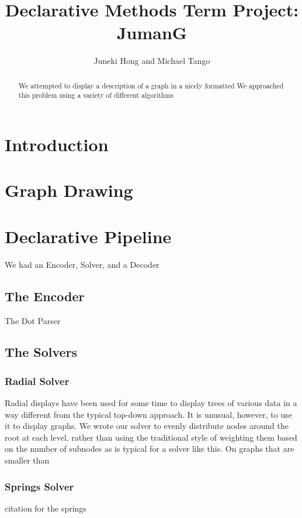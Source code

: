 \documentclass{article}
\title{Declarative Methods Term Project: \\ JumanG}
\author{Juneki Hong and Michael Tango}
\date{}
\begin{document}
\maketitle

\begin{abstract}
We attempted to display a description of a graph in a nicely formatted 
We approached this problem using a variety of different algorithms
\end{abstract}

\section{Introduction}

\section{Graph Drawing}


\section{Declarative Pipeline}

We had an Encoder, Solver, and a Decoder

\subsection{The Encoder}
The Dot Parser

\subsection{The Solvers}

\subsubsection{Radial Solver}
Radial displays have been used for some time to display trees of various data in a way different from the typical top-down approach.
It is unusual, however, to use it to display graphs. We wrote our solver to evenly distribute nodes around the root at each level,
rather than using the traditional style of weighting them based on the number of subnodes as is typical for a solver like this. 
On graphs that are smaller than 

\subsubsection{Springs Solver}
citation for the springs\cite{springs}
\end{document}
